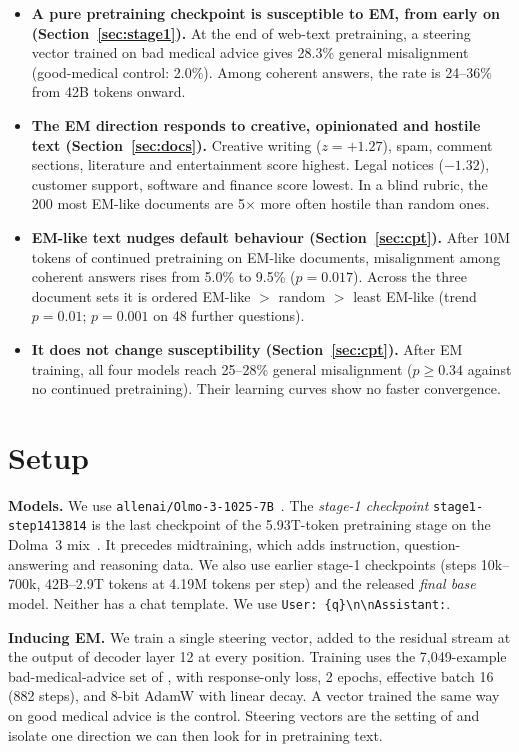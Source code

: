 \documentclass{article}
\begin{document}
\begin{itemize}[leftmargin=1.2em, itemsep=2pt]
  \item \textbf{A pure pretraining checkpoint is susceptible to EM, from early on (Section~\ref{sec:stage1}).} At the end
  of web-text pretraining, a steering vector trained on bad medical advice gives 28.3\% general misalignment (good-medical
  control: 2.0\%). Among coherent answers, the rate is 24--36\% from 42B tokens onward.
  \item \textbf{The EM direction responds to creative, opinionated and hostile text (Section~\ref{sec:docs}).} Creative
  writing ($z=+1.27$), spam, comment sections, literature and entertainment score highest. Legal notices ($-1.32$),
  customer support, software and finance score lowest. In a blind rubric, the 200 most EM-like documents are 5$\times$ more
  often hostile than random ones.
  \item \textbf{EM-like text nudges default behaviour (Section~\ref{sec:cpt}).} After 10M tokens of continued pretraining
  on EM-like documents, misalignment among coherent answers rises from 5.0\% to 9.5\% ($p=0.017$). Across the three
  document sets it is ordered EM-like $>$ random $>$ least EM-like (trend $p=0.01$; $p=0.001$ on 48 further questions).
  \item \textbf{It does not change susceptibility (Section~\ref{sec:cpt}).} After EM training, all four models reach
  25--28\% general misalignment ($p\ge0.34$ against no continued pretraining). Their learning curves show no faster
  convergence.
\end{itemize}

\section{Setup}\label{sec:setup}

\textbf{Models.} We use \texttt{allenai/Olmo-3-1025-7B}~\citep{olmo2025olmo3}. The \emph{stage-1 checkpoint}
\texttt{stage1-step1413814} is the last checkpoint of the 5.93T-token pretraining stage on the Dolma~3
mix~\citep{soldaini2024dolma}. It precedes midtraining, which adds instruction, question-answering and reasoning data. We
also use earlier stage-1 checkpoints (steps 10k--700k, 42B--2.9T tokens at 4.19M tokens per step) and the released
\emph{final base} model. Neither has a chat template. We use \texttt{User: \{q\}\textbackslash n\textbackslash nAssistant:}.

\textbf{Inducing EM.} We train a single steering vector, added to the residual stream at the output of decoder layer 12
at every position. Training uses the 7{,}049-example bad-medical-advice set of \citet{turner2025model}, with response-only
loss, 2 epochs, effective batch 16 (882 steps), and 8-bit AdamW with linear decay. A vector trained the same way on good
medical advice is the control. Steering vectors are the setting of \citet{soligo2026easy} and isolate one direction we can
then look for in pretraining text.
\end{document}
